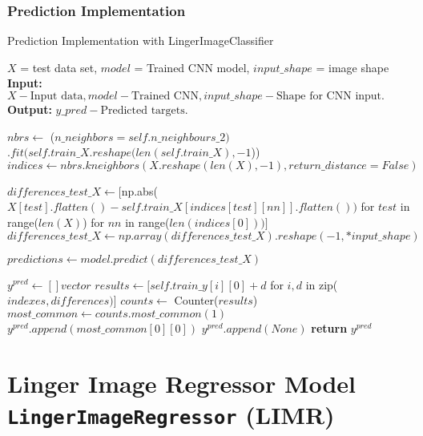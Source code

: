 \documentclass[a4paper, 12pt]{report}
\begin{document}
\subsubsection{Prediction Implementation}

\begin{algorithm}
    \caption{Prediction Implementation with LingerImageClassifier}
    \label{alg:prediction_implementation_with_lingerImageClassifier}
    \begin{algorithmic}[1]
    \State $X$ = test data set, $model$ = Trained CNN model, $input\_shape$ = image shape
        \State \textbf{Input:} $X - \text{Input data}, model - \text{Trained CNN}, input\_shape - \text{Shape for CNN input.}$
        \State \textbf{Output:} $y\_pred - \text{Predicted targets}$.
        
        \State $nbrs \gets$ ($n\_neighbors=self.n\_neighbours\_2)$
        \State \hspace{\algorithmicindent} $.fit(self.train\_X.reshape(len(self.train\_X), -1$))
        \State $indices \gets nbrs.kneighbors(X.reshape(len(X), -1), return\_distance=False)$
        
        \State $differences\_test\_X \gets [$np.abs($X[test].flatten() - self.train\_X[indices[test][nn]].flatten())$ for $test$ in range($len(X)$) for $nn$ in range($len(indices[0]))]$
        \State $differences\_test\_X \gets np.array(differences\_test\_X).reshape(-1, *input\_shape)$
        
        \State $predictions \gets model.predict(differences\_test\_X)$
        
        \State $y^{pred} \gets [] vector$
            \State $results \gets [self.train\_y[i][0] + d$ for $i, d$ in zip($indexes, differences)$]
            \State $counts \gets$ Counter($results$)
            \State $most\_common \gets counts.most\_common(1)$
                \State $y^{pred}.append(most\_common[0][0])$
            \Else
                \State $y^{pred}.append(None)$
            \EndIf
        \EndFor
        \State \textbf{return} $y^{pred}$
    \EndProcedure
    \end{algorithmic}
\end{algorithm}

\section{Linger Image Regressor Model \texttt{LingerImageRegressor} (LIMR)}
\label{sec:lingerImage_Regressor_model}
\end{document}
